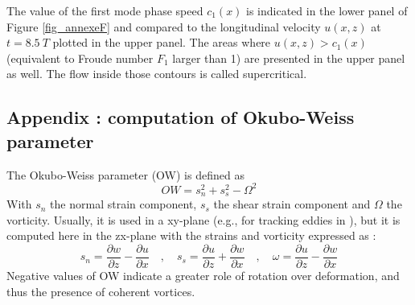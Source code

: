  The value of the first mode phase speed $c_1(x)$  is indicated in the lower panel of Figure \ref{fig_annexeF} and compared to the longitudinal velocity $u(x,z)$ at $t = 8.5\ T$ plotted in the upper panel. The areas where $u(x,z) > c_1 (x)$ (equivalent to Froude number $F_1$ larger than 1) are presented in the upper panel as well. The flow inside those contours is called supercritical.
 
 \subsection{Appendix : computation of Okubo-Weiss parameter}
 \label{annexeOW}
The Okubo-Weiss parameter (OW) is defined as
\begin{equation}
OW=s_n^2+s_s^2-\Omega^2
\label{eqOW}
\end{equation}
With $s_n$ the normal strain component, $s_s$ the shear strain component and $\Omega$ the vorticity. Usually, it is used in a xy-plane (e.g., for tracking eddies in \citet{Chelton2007}), but it is computed here in the zx-plane with the strains and vorticity expressed as :
\begin{equation}
s_n = \frac{\partial w}{\partial z} - \frac{\partial u}{\partial x} \quad , \quad
s_s = \frac{\partial u}{\partial z} + \frac{\partial w}{\partial x} \quad , \quad
\omega = \frac{\partial u}{\partial z} - \frac{\partial w}{\partial x}
\end{equation}
Negative values of OW indicate a greater role of rotation over deformation, and thus the presence of coherent vortices.

